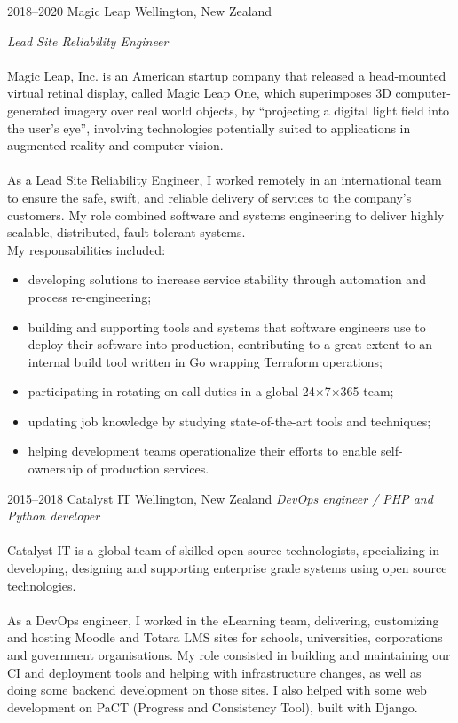 \documentclass[]{friggeri-cv}
\begin{document}
\begin{entrylist}

  \entry
    {2018--2020}
    {Magic Leap}
    {Wellington, New Zealand}
    {
      \textit{Lead Site Reliability Engineer} \\
      \\
      Magic Leap, Inc. is an American startup company that released a
      head-mounted virtual retinal display, called Magic Leap One, which
      superimposes 3D computer-generated imagery over real world objects, by
      ``projecting a digital light field into the user's eye'', involving
      technologies potentially suited to applications in augmented reality and
      computer vision. \\
      \\
      As a Lead Site Reliability Engineer, I worked remotely in an
      international team to ensure the safe, swift, and reliable delivery of
      services to the company's customers. My role combined software and
      systems engineering to deliver highly scalable, distributed, fault
      tolerant systems.
      \\
      My responsabilities included:
      \begin{itemize}
        \item developing solutions to increase service stability through
              automation and process re-engineering;
        \item building and supporting tools and systems that software engineers
              use to deploy their software into production,
              contributing to a great extent to an internal build tool written
              in Go wrapping Terraform operations;
        \item participating in rotating on-call duties in a global
              24$\times$7$\times$365 team;
        \item updating job knowledge by studying state-of-the-art tools and
              techniques;
        \item helping development teams operationalize their efforts to enable
              self-ownership of production services.
      \end{itemize}
    }

  \entry
    {2015--2018}
    {Catalyst IT}
    {Wellington, New Zealand}
    {
      \textit{DevOps engineer / PHP and Python developer} \\
      \\
      Catalyst IT is a global team of skilled open source technologists,
      specializing in developing, designing and supporting enterprise grade
      systems using open source technologies. \\
      \\
      As a DevOps engineer, I worked in the eLearning team, delivering,
      customizing and hosting Moodle and Totara LMS sites for schools,
      universities, corporations and government organisations. My role
      consisted in building and maintaining our CI and deployment tools and
      helping with infrastructure changes, as well as doing some backend
      development on those sites. I also helped with some web development on
      PaCT (Progress and Consistency Tool), built with Django.
    }


\end{entrylist}
\end{document}
